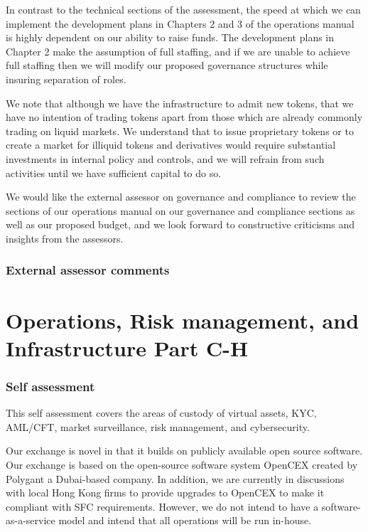 \documentclass[]{report}
\begin{document}
In contrast to the technical sections of the assessment, the speed at
which we can implement the development plans in Chapters 2 and 3 of
the operations manual is highly dependent on our ability to raise
funds.  The development plans in Chapter 2 make the assumption of full
staffing, and if we are unable to achieve full staffing
then we will modify our proposed governance structures while insuring
separation of roles.

We note that although we have the infrastructure to admit new tokens,
that we have no intention of trading tokens apart from those which are
already commonly trading on liquid markets.  We understand that to
issue proprietary tokens or to create a market for illiquid tokens and
derivatives would require substantial investments in internal policy
and controls, and we will refrain from such activities until we have
sufficient capital to do so.

We would like the external assessor on governance and compliance to
review the sections of our operations manual on our governance and
compliance sections as well as our proposed budget, and we look forward
to constructive criticisms and insights from the assessors.

\subsection{External assessor comments}

\chapter{Operations, Risk management, and Infrastructure Part C-H}

\subsection{Self assessment}

This self assessment covers the areas of custody of virtual assets,
KYC, AML/CFT, market surveillance, risk management, and cybersecurity.

Our exchange is novel in that it builds on publicly available open
source software.  Our exchange is based on the open-source software
system OpenCEX created by Polygant a Dubai-based company.  In addition,
we are currently in discussions with local Hong Kong firms to provide
upgrades to OpenCEX to make it compliant with SFC requirements.
However, we do not intend to have a software-as-a-service model and
intend that all operations will be run in-house.
\end{document}
